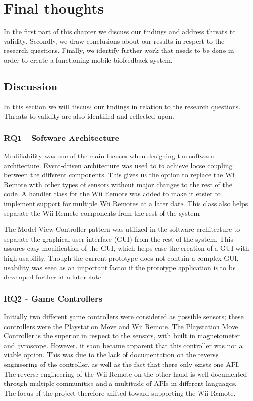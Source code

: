 \chapter{Final thoughts}
In the first part of this chapter we discuss our findings and address threats to validity. Secondly, we draw conclusions about our results in respect to the research questions. Finally, we identify further work that needs to be done in order to create a functioning mobile biofeedback system.

\section{Discussion}
In this section we will discuss our findings in relation to the research questions. Threats to validity are also identified and reflected upon.

\subsection{RQ1 - Software Architecture}
Modifiability was one of the main focuses when designing the software architecture. Event-driven architecture was used to to achieve loose coupling between the different components. This gives us the option to replace the Wii Remote with other types of sensors without major changes to the rest of the code. A handler class for the Wii Remote was added to make it easier to implement support for multiple Wii Remotes at a later date. This class also helps separate the Wii Remote components from the rest of the system. 

The Model-View-Controller pattern was utilized in the software architecture to separate the graphical user interface (GUI) from the rest of the system. This assures easy modification of the GUI, which helps ease the creation of a GUI with high usability. Though the current prototype does not contain a complex GUI, usability was seen as an important factor if the prototype application is to be developed further at a later date.

\subsection{RQ2 - Game Controllers}
Initially two different game controllers were considered as possible sensors; these controllers were the Playstation Move and Wii Remote. The Playstation Move Controller is the superior in respect to the sensors, with built in magnetometer and gyroscope. However, it soon became apparent that this controller was not a viable option. This was due to the lack of documentation on the reverse engineering of the controller, as well as the fact that there only exists one API. The reverse engineering of the Wii Remote on the other hand is well documented through multiple communities and a multitude of APIs in different languages. The focus of the project therefore shifted toward supporting the Wii Remote.

